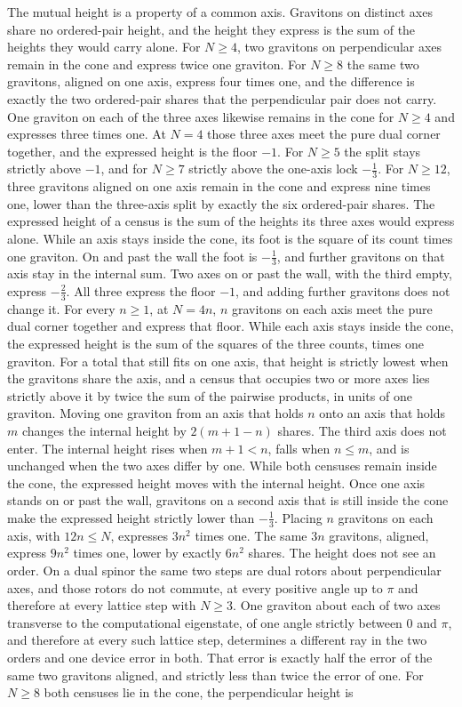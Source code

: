 \documentclass[a4paper]{article}
\begin{document}
The mutual height is a property of a common axis. Gravitons on distinct axes share no ordered-pair height, and the height they express is the sum of the heights they would carry alone. For \(N\ge 4\), two gravitons on perpendicular axes remain in the cone and express twice one graviton. For \(N\ge 8\) the same two gravitons, aligned on one axis, express four times one, and the difference is exactly the two ordered-pair shares that the perpendicular pair does not carry. One graviton on each of the three axes likewise remains in the cone for \(N\ge 4\) and expresses three times one. At \(N=4\) those three axes meet the pure dual corner together, and the expressed height is the floor \(-1\). For \(N\ge 5\) the split stays strictly above \(-1\), and for \(N\ge 7\) strictly above the one-axis lock \(-\frac13\). For \(N\ge 12\), three gravitons aligned on one axis remain in the cone and express nine times one, lower than the three-axis split by exactly the six ordered-pair shares. The expressed height of a census is the sum of the heights its three axes would express alone. While an axis stays inside the cone, its foot is the square of its count times one graviton. On and past the wall the foot is \(-\frac13\), and further gravitons on that axis stay in the internal sum. Two axes on or past the wall, with the third empty, express \(-\frac23\). All three express the floor \(-1\), and adding further gravitons does not change it. For every \(n\ge 1\), at \(N=4n\), \(n\) gravitons on each axis meet the pure dual corner together and express that floor. While each axis stays inside the cone, the expressed height is the sum of the squares of the three counts, times one graviton. For a total that still fits on one axis, that height is strictly lowest when the gravitons share the axis, and a census that occupies two or more axes lies strictly above it by twice the sum of the pairwise products, in units of one graviton. Moving one graviton from an axis that holds \(n\) onto an axis that holds \(m\) changes the internal height by \(2(m+1-n)\) shares. The third axis does not enter. The internal height rises when \(m+1<n\), falls when \(n\le m\), and is unchanged when the two axes differ by one. While both censuses remain inside the cone, the expressed height moves with the internal height. Once one axis stands on or past the wall, gravitons on a second axis that is still inside the cone make the expressed height strictly lower than \(-\frac13\). Placing \(n\) gravitons on each axis, with \(12n\le N\), expresses \(3n^2\) times one. The same \(3n\) gravitons, aligned, express \(9n^2\) times one, lower by exactly \(6n^2\) shares. The height does not see an order. On a dual spinor the same two steps are dual rotors about perpendicular axes, and those rotors do not commute, at every positive angle up to \(\pi\) and therefore at every lattice step with \(N\ge 3\). One graviton about each of two axes transverse to the computational eigenstate, of one angle strictly between \(0\) and \(\pi\), and therefore at every such lattice step, determines a different ray in the two orders and one device error in both. That error is exactly half the error of the same two gravitons aligned, and strictly less than twice the error of one. For \(N\ge 8\) both censuses lie in the cone, the perpendicular height is 
\end{document}
